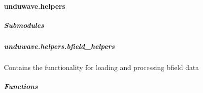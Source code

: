 \documentclass[letterpaper,10pt,english]{sphinxmanual}
\begin{document}
\sphinxstepscope


\paragraph{unduwave.helpers}
\label{\detokenize{autoapi/unduwave/helpers/index:module-unduwave.helpers}}\label{\detokenize{autoapi/unduwave/helpers/index:unduwave-helpers}}\label{\detokenize{autoapi/unduwave/helpers/index::doc}}

\subparagraph{Submodules}
\label{\detokenize{autoapi/unduwave/helpers/index:submodules}}
\sphinxstepscope


\subparagraph{unduwave.helpers.bfield\_helpers}
\label{\detokenize{autoapi/unduwave/helpers/bfield_helpers/index:module-unduwave.helpers.bfield_helpers}}\label{\detokenize{autoapi/unduwave/helpers/bfield_helpers/index:unduwave-helpers-bfield-helpers}}\label{\detokenize{autoapi/unduwave/helpers/bfield_helpers/index::doc}}
\sphinxAtStartPar
Contains the functionality for loading and processing b\sphinxhyphen{}field data


\subparagraph{Functions}
\label{\detokenize{autoapi/unduwave/helpers/bfield_helpers/index:functions}}
\end{document}
